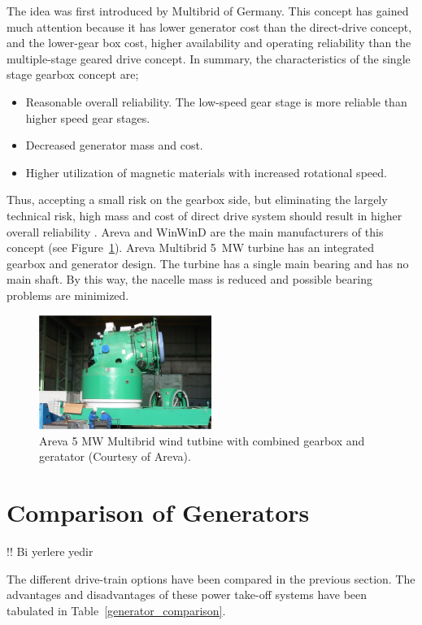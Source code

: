 \documentclass[a4paper, 11pt]{article} %
\begin{document}
The idea was first introduced by Multibrid of Germany. This concept has gained much attention because it has lower generator cost than the direct-drive concept, and the lower-gear box cost, higher availability and operating reliability than the multiple-stage geared drive concept. In summary, the characteristics of the single stage gearbox concept are;

\begin{itemize}
	\item Reasonable overall reliability. The low-speed gear stage is more reliable than higher speed gear stages.
	\item Decreased generator mass and cost.
	\item Higher utilization of magnetic materials with increased rotational speed.
\end{itemize}

Thus, accepting a small risk on the gearbox side, but eliminating the largely technical risk, high mass and cost of direct drive system should result in higher overall reliability \cite{Bohmeke2003}. Areva and WinWinD are the main manufacturers of this concept (see Figure~\ref{multibrid}). Areva Multibrid 5~MW turbine has an integrated gearbox and generator design. The turbine has a single main bearing and has no main shaft. By this way, the nacelle mass is reduced and possible bearing problems are minimized. 

  \begin{figure}
    \centering
    \includegraphics[width=0.5\textwidth]{multibrid}
    \caption{Areva 5 MW Multibrid wind tutbine with combined gearbox and geratator (Courtesy of Areva).} 
    \label{multibrid}
  \end{figure}

\section{Comparison of Generators}

!! Bi yerlere yedir

The different drive-train options have been compared in the previous section. The advantages and disadvantages of these power take-off systems have been tabulated in Table~\ref{generator_comparison}.
\end{document}
